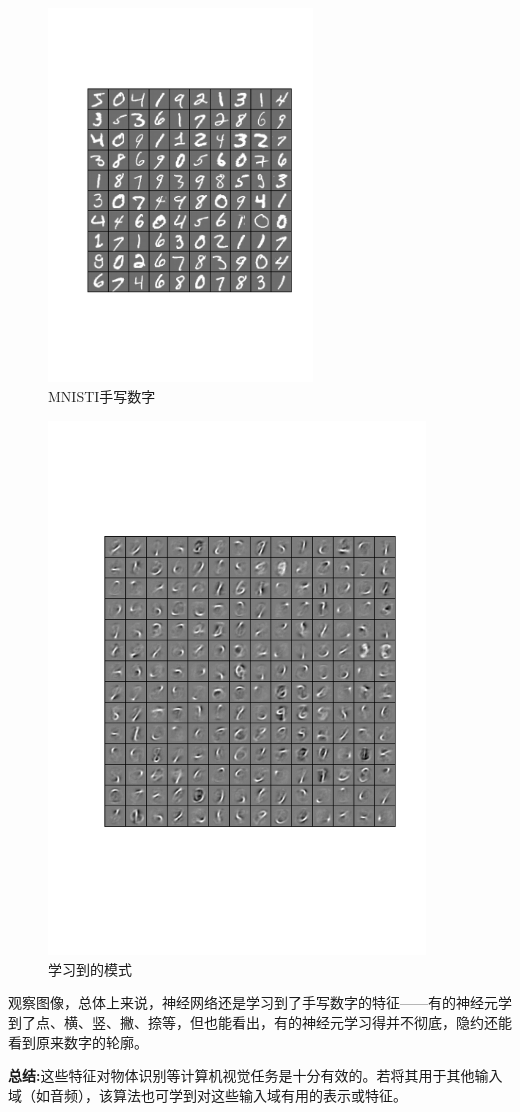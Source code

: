 \begin{figure}[H]
\centering
\includegraphics[width=7cm]{fig/MNISTI_input.pdf}
\caption{MNISTI手写数字}
\end{figure}

\begin{figure}[H]
\centering
\includegraphics[width=10cm]{fig/MNISTI_output.pdf}
\caption{学习到的模式}
\end{figure}

观察图像，总体上来说，神经网络还是学习到了手写数字的特征——有的神经元学到了点、横、竖、撇、捺等，但也能看出，有的神经元学习得并不彻底，隐约还能看到原来数字的轮廓。

\textbf{总结:}这些特征对物体识别等计算机视觉任务是十分有效的。若将其用于其他输入域（如音频），该算法也可学到对这些输入域有用的表示或特征。
